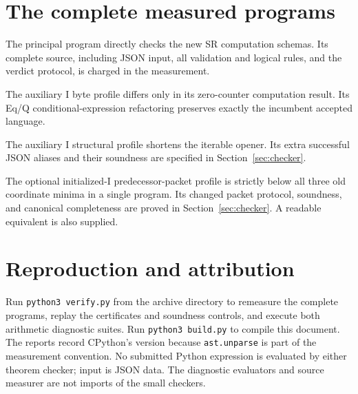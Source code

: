 \documentclass[11pt,letterpaper]{article}
\theoremstyle{definition}\newtheorem{definition}[theorem]{Definition}
\theoremstyle{remark}\newtheorem{remark}[theorem]{Remark}
\begin{document}
\section{The complete measured programs}
\label{app:programs}
\begin{minipage}{\linewidth}
The principal program directly checks the new SR computation schemas.
Its complete source, including JSON input, all validation and logical
rules, and the verdict protocol, is charged in the measurement.

\end{minipage}
\par\medskip
\begin{minipage}{\linewidth}
The auxiliary I byte profile differs only in its zero-counter computation
result. Its Eq/Q conditional-expression refactoring preserves exactly the
incumbent accepted language.

\end{minipage}
\par\medskip
\begin{minipage}{\linewidth}
The auxiliary I structural profile shortens the iterable opener. Its extra
successful JSON aliases and their soundness are specified in
Section~\ref{sec:checker}.

\end{minipage}
\par\medskip
\begin{minipage}{\linewidth}
The optional initialized-I predecessor-packet profile is strictly below
all three old coordinate minima in a single program. Its changed packet
protocol, soundness, and canonical completeness are proved in
Section~\ref{sec:checker}. A readable equivalent is also supplied.

\end{minipage}
\par\medskip
\clearpage
\section{Reproduction and attribution}
Run \texttt{python3 verify.py} from the archive directory to remeasure the
complete programs, replay the certificates and soundness controls, and
execute both arithmetic diagnostic suites. Run \texttt{python3 build.py}
to compile this document. The reports record CPython's version because
\texttt{ast.unparse} is part of the measurement convention. No submitted
Python expression is evaluated by either theorem checker; input is JSON
data. The diagnostic evaluators and source measurer are not imports of
the small checkers.
\end{document}
